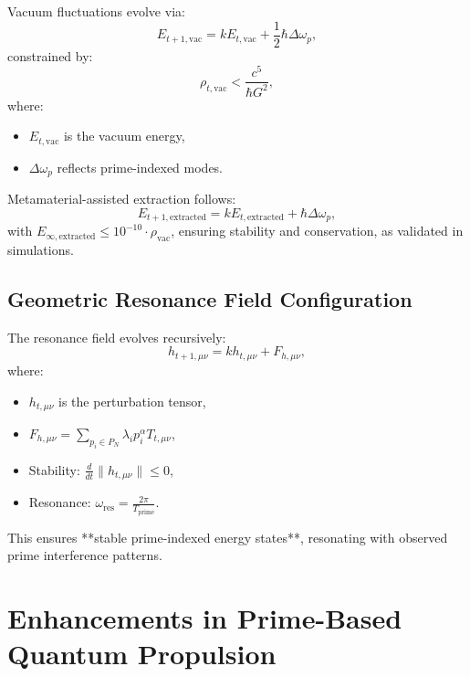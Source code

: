 \documentclass{article}
\theoremstyle{plain}
\begin{document}
Vacuum fluctuations evolve via:
\begin{equation}
    E_{t+1,\text{vac}} = k E_{t,\text{vac}} + \frac{1}{2} \hbar \Delta \omega_p,
\end{equation}
constrained by:
\begin{equation}
    \rho_{t,\text{vac}} < \frac{c^5}{\hbar G^2},
\end{equation}
where:
\begin{itemize}
    \item \( E_{t,\text{vac}} \) is the vacuum energy,
    \item \( \Delta \omega_p \) reflects prime-indexed modes.
\end{itemize}
Metamaterial-assisted extraction follows:
\begin{equation}
    E_{t+1,\text{extracted}} = k E_{t,\text{extracted}} + \hbar \Delta \omega_p,
\end{equation}
with \( E_{\infty,\text{extracted}} \leq 10^{-10} \cdot \rho_{\text{vac}} \), ensuring stability and conservation, as validated in simulations.

\subsection{Geometric Resonance Field Configuration}
\label{subsec:geometric_field}

The resonance field evolves recursively:
\begin{equation}
    h_{t+1,\mu\nu} = k h_{t,\mu\nu} + F_{h,\mu\nu},
\end{equation}
where:
\begin{itemize}
    \item \( h_{t,\mu\nu} \) is the perturbation tensor,
    \item \( F_{h,\mu\nu} = \sum_{p_i \in P_N} \lambda_i p_i^\alpha T_{t,\mu\nu} \),
    \item Stability: \( \frac{d}{dt} \| h_{t,\mu\nu} \| \leq 0 \),
    \item Resonance: \( \omega_{\text{res}} = \frac{2\pi}{T_{\text{prime}}} \).
\end{itemize}
This ensures **stable prime-indexed energy states**, resonating with observed prime interference patterns.


\section{Enhancements in Prime-Based Quantum Propulsion}
\label{sec:enhancements}
\end{document}

